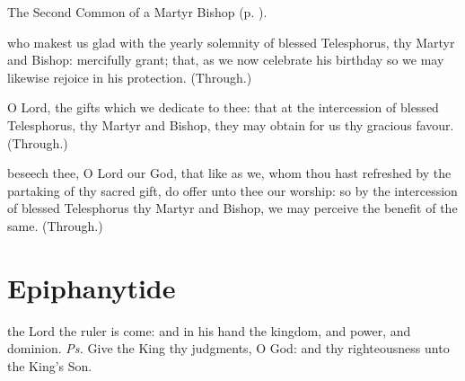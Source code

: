 \clearpage
{}

\begin{rubric}
	The Second Common of a Martyr Bishop (p. \pageref{CommonMartyrBishopII}).
\end{rubric}

\collect\label{TelesphorusCollect}
 who makest us glad with the yearly solemnity of blessed Telesphorus, thy Martyr and Bishop: mercifully grant; that, as we now celebrate his birthday so we may likewise rejoice in his protection. (Through.)

\secret\label{TelesphorusSecret}
 O Lord, the gifts which we dedicate to thee: that at the intercession of blessed Telesphorus, thy Martyr and Bishop, they may obtain for us thy gracious favour. (Through.)

\postcommunion\label{TelesphorusPostcommunion}
 beseech thee, O Lord our God, that like as we, whom thou hast refreshed by the partaking of thy sacred gift, do offer unto thee our worship: so by the intercession of blessed Telesphorus thy Martyr and Bishop, we may perceive the benefit of the same. (Through.)

\section{Epiphanytide}

\label{EpiphanyMass}

\introit
{} the Lord the ruler is come: and in his hand the kingdom, and power, and dominion. \textit{Ps.} Give the King thy judgments, O God: and thy righteousness unto the King's Son.


